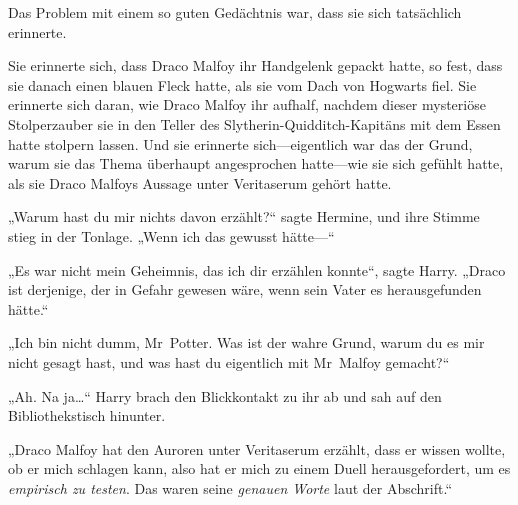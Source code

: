 Das Problem mit einem so guten Gedächtnis war, dass sie sich tatsächlich erinnerte.



Sie erinnerte sich, dass Draco Malfoy ihr Handgelenk gepackt hatte, so fest, dass sie danach einen blauen Fleck hatte, als sie vom Dach von Hogwarts fiel. Sie erinnerte sich daran, wie Draco Malfoy ihr aufhalf, nachdem dieser mysteriöse Stolperzauber sie in den Teller des Slytherin-Quidditch-Kapitäns mit dem Essen hatte stolpern lassen. Und sie erinnerte sich—eigentlich war das der Grund, warum sie das Thema überhaupt angesprochen hatte—wie sie sich gefühlt hatte, als sie Draco Malfoys Aussage unter Veritaserum gehört hatte.

„Warum hast du mir nichts davon erzählt?“ sagte Hermine, und ihre Stimme stieg in der Tonlage. „Wenn ich das gewusst hätte—“

„Es war nicht mein Geheimnis, das ich dir erzählen konnte“, sagte Harry. „Draco ist derjenige, der in Gefahr gewesen wäre, wenn sein Vater es herausgefunden hätte.“

„Ich bin nicht dumm, Mr~Potter. Was ist der wahre Grund, warum du es mir nicht gesagt hast, und was hast du eigentlich mit Mr~Malfoy gemacht?“

„Ah. Na ja…“ Harry brach den Blickkontakt zu ihr ab und sah auf den Bibliothekstisch hinunter.

„Draco Malfoy hat den Auroren unter Veritaserum erzählt, dass er wissen wollte, ob er mich schlagen kann, also hat er mich zu einem Duell herausgefordert, um es \emph{empirisch zu testen}. Das waren seine \emph{genauen Worte} laut der Abschrift.“

